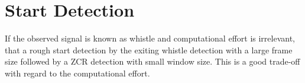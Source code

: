 \section{Start Detection}
\label{sec:05_startDetection}

If the observed signal is known as whistle and computational effort is
irrelevant, 
that a rough start detection by the exiting whistle detection
with a large frame size followed by a \ac{ZCR} detection with small
window size.
This is a good trade-off with regard to the computational effort.
